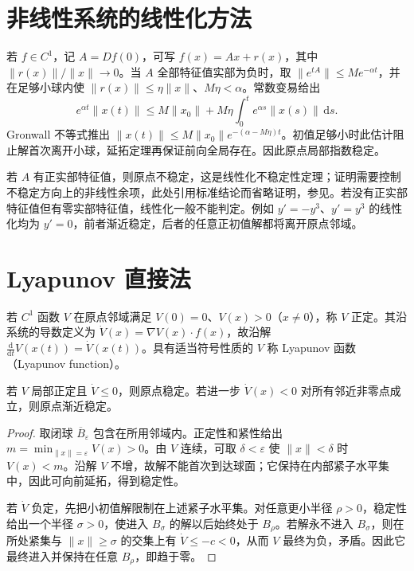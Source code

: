 \section{非线性系统的线性化方法}
若 $f\in C^1$，记 $A=Df(0)$，可写 $f(x)=Ax+r(x)$，其中 $\|r(x)\|/\|x\|\to0$。当 $A$ 全部特征值实部为负时，取 $\|e^{tA}\|\leq Me^{-\alpha t}$，并在足够小球内使 $\|r(x)\|\leq\eta\|x\|$、$M\eta<\alpha$。常数变易给出
\[
 e^{\alpha t}\|x(t)\|\leq M\|x_0\|+M\eta\int_0^t e^{\alpha s}\|x(s)\|\,\mathrm ds.
\]
Gronwall 不等式推出 $\|x(t)\|\leq M\|x_0\|e^{-(\alpha-M\eta)t}$。初值足够小时此估计阻止解首次离开小球，延拓定理再保证前向全局存在。因此原点局部指数稳定。

若 $A$ 有正实部特征值，则原点不稳定，这是线性化不稳定性定理；证明需要控制不稳定方向上的非线性余项，此处引用标准结论而省略证明，参见\cite[第9章]{teschl-ode}。若没有正实部特征值但有零实部特征值，线性化一般不能判定。例如 $y'=-y^3$、$y'=y^3$ 的线性化均为 $y'=0$，前者渐近稳定，后者的任意正初值解都将离开原点邻域。

\section{Lyapunov 直接法}
\begin{definition}
若 $C^1$ 函数 $V$ 在原点邻域满足 $V(0)=0$、$V(x)>0$（$x\ne0$），称 $V$ 正定。其沿系统的导数定义为 $\dot V(x)=\nabla V(x)\cdot f(x)$，故沿解 $\frac{\mathrm d}{\mathrm dt}V(x(t))=\dot V(x(t))$。具有适当符号性质的 $V$ 称 Lyapunov 函数（Lyapunov function）。
\end{definition}

\begin{theorem}
若 $V$ 局部正定且 $\dot V\leq0$，则原点稳定。若进一步 $\dot V(x)<0$ 对所有邻近非零点成立，则原点渐近稳定。
\end{theorem}
\begin{proof}
取闭球 $\overline B_\varepsilon$ 包含在所用邻域内。正定性和紧性给出 $m=\min_{\|x\|=\varepsilon}V(x)>0$。由 $V$ 连续，可取 $\delta<\varepsilon$ 使 $\|x\|<\delta$ 时 $V(x)<m$。沿解 $V$ 不增，故解不能首次到达球面；它保持在内部紧子水平集中，因此可向前延拓，得到稳定性。

若 $\dot V$ 负定，先把小初值解限制在上述紧子水平集。对任意更小半径 $\rho>0$，稳定性给出一个半径 $\sigma>0$，使进入 $B_\sigma$ 的解以后始终处于 $B_\rho$。若解永不进入 $B_\sigma$，则在所处紧集与 $\|x\|\geq\sigma$ 的交集上有 $\dot V\leq-c<0$，从而 $V$ 最终为负，矛盾。因此它最终进入并保持在任意 $B_\rho$，即趋于零。
\end{proof}


